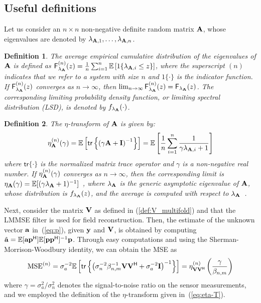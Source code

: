 \documentclass[11pt, draftcls, onecolumn, a4paper]{IEEEtran}
\newtheorem{definition}{Definition}[section]
\newcommand{\av}{{\bf a}}
\newcommand{\pv}{{\bf p}}
\newcommand{\yv}{{\bf y}}
\def\Fsf{ {\sf F}}
\newcommand{\Am}{{\bf A}}
\newcommand{\Id}{{\bf I}}
\newcommand{\Vm}{{\bf V}}
\def\tracen{\mathsf{tr}}
\def\Herm{\mathsf{^H}}
\begin{document}
\subsection{Useful definitions} 
Let us consider an $n \times n$ non-negative definite random matrix $\Am$,
whose eigenvalues are denoted by $\lambda_{\Am,1}, \ldots, \lambda_{\Am, n}$.

\begin{definition}
The average empirical cumulative distribution of the eigenvalues of
$\Am$ is defined as $\Fsf_{\lambda_\Am}^{(n)} (z)= \frac{1}{n}
\sum_{i=1}^n \EE \left [ 1\{\lambda_{\Am,i} \leq z \} \right]$, where
the superscript $(n)$ indicates that we refer to a system with size
$n$ and $1 \{\cdot\}$ is the indicator function.  If
$\Fsf_{\lambda_\Am}^{(n)}(z)$ converges as $n \rightarrow \infty$,
then $\lim_{n \rightarrow \infty}\Fsf_{\lambda_\Am}^{(n)}(z) =
\Fsf_{\lambda_\Am}(z)$.  The corresponding limiting probability
density function, or limiting spectral distribution (LSD), is denoted
by $f_{\lambda_\Am}(\cdot)$.
\end{definition}

\begin{definition}
The $\eta$-transform of $\Am$ is given by:
\begin{equation}
\label{eq:eta-T}
\eta^{(n)}_\Am(\gamma)
=  \EE\left[\tracen\left\{\left(\gamma \Am+\Id\right)^{-1} \right\}\right]  = \EE\left[\frac{1}{n}\sum_{i=1}^n\frac{1}{\gamma\lambda_{\Am,i} +1}\right] 
\end{equation}
where $\tracen\{\cdot\}$ is the normalized matrix trace operator 
and $\gamma$ is a non-negative real number.  If
$\eta_{\Am}^{(n)}(\gamma)$ converges as $n \rightarrow \infty$, then
the corresponding limit is $\eta_{\Am}(\gamma) = \EE[(\gamma
  \lambda_\Am+1)^{-1}]$~\cite[p. 40]{tutorial},  where 
$\lambda_\Am$ is the generic asymptotic eigenvalue of $\Am$, 
whose distribution is $f_{\lambda_\Am}(z)$, and the average is
computed with respect to $\lambda_\Am$~\cite{tutorial}.
\end{definition}

Next, consider the matrix $\Vm$ as defined in (\ref{def:V_multifold}) 
and that  the LMMSE filter is used for field reconstruction.
Then, the estimate of the unknown vector
$\av$ in~(\ref{eq:p}), given $\yv$ and $\Vm$, is obtained by computing
$\hat{\av} = \EE[\av\pv\Herm] \EE[\pv\pv\Herm]^{-1} \pv$. Through easy
computations and using the Sherman-Morrison-Woodbury identity, 
we can obtain the MSE as 
\begin{equation}
{\rm MSE}^{(n)}
=\sigma_a^{-2}\EE\left[\tracen\left\{\left(\sigma_n^{-2}\beta_{n,m}^{-1}\Vm\Vm\Herm+\sigma_a^{-2}\Id\right)^{-1}\right\}\right] = \eta^{(n)}_{\Vm\Vm\Herm}\left(\frac{\gamma}{\beta_{n,m}}\right)
\label{eq:MSE_n}
\end{equation}
where  $\gamma=\sigma^2_a/\sigma^2_n$ denotes the signal-to-noise
ratio on the sensor measurements, and we employed the definition of the
$\eta$-transform given in~(\ref{eq:eta-T}).
\end{document}
